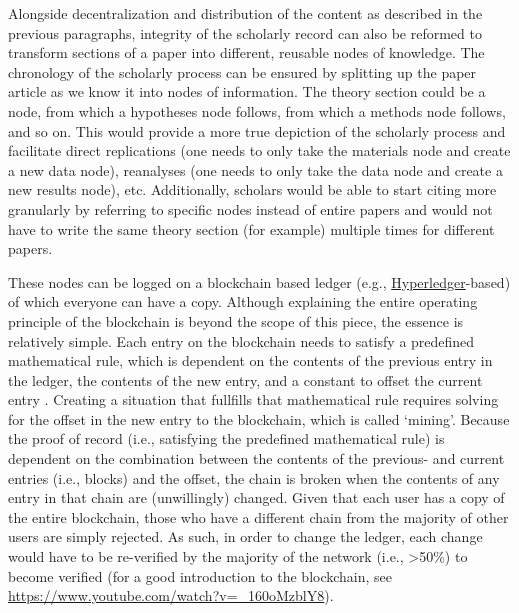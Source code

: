 \documentclass[]{tufte-book}
\begin{document}
Alongside decentralization and distribution of the content as described
in the previous paragraphs, integrity of the scholarly record can also
be reformed to transform sections of a paper into different, reusable
nodes of knowledge. The chronology of the scholarly process can be
ensured by splitting up the paper article as we know it into nodes of
information. The theory section could be a node, from which a hypotheses
node follows, from which a methods node follows, and so on. This would
provide a more true depiction of the scholarly process and facilitate
direct replications (one needs to only take the materials node and
create a new data node), reanalyses (one needs to only take the data
node and create a new results node), etc. Additionally, scholars would
be able to start citing more granularly by referring to specific nodes
instead of entire papers and would not have to write the same theory
section (for example) multiple times for different papers.

These nodes can be logged on a blockchain based ledger (e.g.,
\href{https://github.com/hyperledger/fabric}{Hyperledger}-based) of
which everyone can have a copy. Although explaining the entire operating
principle of the blockchain is beyond the scope of this piece, the
essence is relatively simple. Each entry on the blockchain needs to
satisfy a predefined mathematical rule, which is dependent on the
contents of the previous entry in the ledger, the contents of the new
entry, and a constant to offset the current entry \citep{bitcoin}.
Creating a situation that fullfills that mathematical rule requires
solving for the offset in the new entry to the blockchain, which is
called `mining'. Because the proof of record (i.e., satisfying the
predefined mathematical rule) is dependent on the combination between
the contents of the previous- and current entries (i.e., blocks) and the
offset, the chain is broken when the contents of any entry in that chain
are (unwillingly) changed. Given that each user has a copy of the entire
blockchain, those who have a different chain from the majority of other
users are simply rejected. As such, in order to change the ledger, each
change would have to be re-verified by the majority of the network
(i.e., \textgreater{}50\%) to become verified (for a good introduction
to the blockchain, see
\url{https://www.youtube.com/watch?v=_160oMzblY8}).
\end{document}
